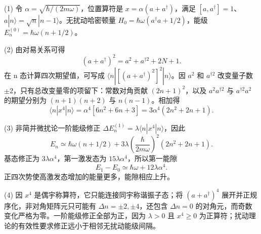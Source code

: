 (1) 令 \(\alpha=\sqrt{\hbar/(2m\omega)}\)，位置算符是 \(x=\alpha(a+a^\dagger)\)，满足 \([a,a^\dagger]=1\)、\(a|n\rangle=\sqrt n|n-1\rangle\)。无扰动哈密顿量 \(H_0=\hbar\omega(a^\dagger a+1/2)\)，能级 \(E_n^{(0)}=\hbar\omega(n+1/2)\)。

(2) 由对易关系可得
\[
(a+a^\dagger)^2=a^2+a^{\dagger2}+2N+1.
\]
在 n 态计算四次期望值，可写成 \(\langle n|[(a+a^\dagger)^2]^2|n\rangle\)。因 \(a^2\) 和 \(a^{\dagger2}\) 改变量子数 \(\pm 2\)，只有总改变量零的项留下：常数对角贡献 \((2n+1)^2\)，以及 \(a^2a^{\dagger2}\) 与 \(a^{\dagger2}a^2\) 的期望分别为 \((n+1)(n+2)\) 与 \(n(n-1)\)。相加得
\[
\langle n|x^4|n\rangle
=\alpha^4[6n^2+6n+3]
=3\alpha^4(2n^2+2n+1).
\]

(3) 非简并微扰论一阶能级修正 \(\Delta E_n^{(1)}=\lambda\langle n|x^4|n\rangle\)，因此
\[
E_n\simeq\hbar\omega(n+1/2)
+3\lambda\left(\frac{\hbar}{2m\omega}\right)^2(2n^2+2n+1).
\]
基态修正为 \(3\lambda\alpha^4\)，第一激发态为 \(15\lambda\alpha^4\)，所以第一能隙
\[
E_1-E_0\simeq\hbar\omega+12\lambda\alpha^4.
\]
正四次势使高激发态增加的能量更多，能隙相应上升。

(4) 因 \(x^{4}\) 是偶宇称算符，它只能连接同宇称谐振子态；将 \((a+a^\dagger)^4\) 展开并正规序化，非对角矩阵元只可能有 \(\Delta n=\pm2,\pm4\)，还包含 \(\Delta n=0\) 的对角元，而奇数变化严格为零。一阶能级修正全部为正，因为 \(\lambda >0\) 且 \(x^4\ge0\) 为正算符；扰动理论的有效性要求修正远小于相邻无扰动能级间隔。
